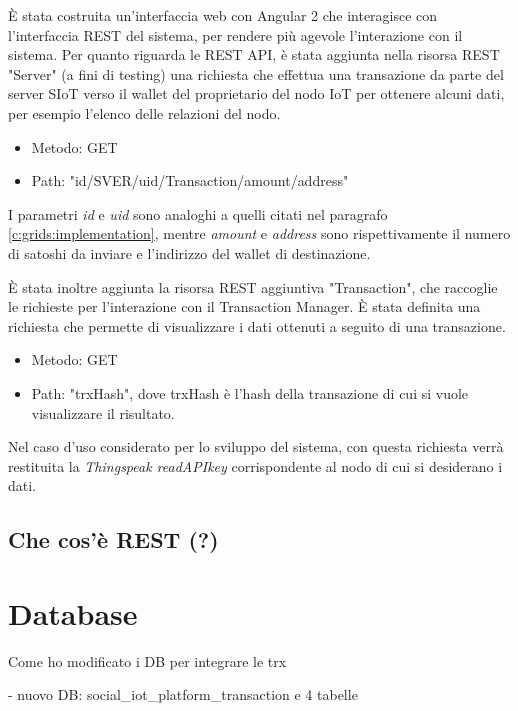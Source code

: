 È stata costruita un'interfaccia web con Angular 2 che interagisce con l'interfaccia REST del sistema, per rendere più agevole l'interazione con il sistema.
Per quanto riguarda le REST API, è stata aggiunta nella risorsa REST "Server" (a fini di testing) una richiesta che effettua una transazione da parte del server SIoT verso il wallet del proprietario del nodo IoT per ottenere alcuni dati, per esempio l'elenco delle relazioni del nodo.
\begin{itemize}
    \item Metodo: GET
    \item Path: "{id}/SVER/{uid}/Transaction/{amount}/{address}"
\end{itemize}

I parametri \textit{id} e \textit{uid} sono analoghi a quelli citati nel paragrafo \ref{c:grids:implementation}, mentre \textit{amount} e \textit{address} sono rispettivamente il numero di satoshi da inviare e l'indirizzo del wallet di destinazione.

È stata inoltre aggiunta la risorsa REST aggiuntiva "Transaction", che raccoglie le richieste per l'interazione con il Transaction Manager. È stata definita una richiesta che permette di visualizzare i dati ottenuti a seguito di una transazione.
\begin{itemize}
    \item Metodo: GET
    \item Path: "{trxHash}", dove trxHash è l'hash della transazione di cui si vuole visualizzare il risultato.
\end{itemize}

Nel caso d'uso considerato per lo sviluppo del sistema, con questa richiesta verrà restituita la \textit{Thingspeak readAPIkey} corrispondente al nodo di cui si desiderano i dati.


\subsection{Che cos'è REST (?)}
\label{c:integr:webrest:boh}

\cite{FerreiraFilho2009}

\section{Database}
\label{c:integr:db}

Come ho modificato i DB per integrare le trx

- nuovo DB: social\_iot\_platform\_transaction e 4 tabelle

